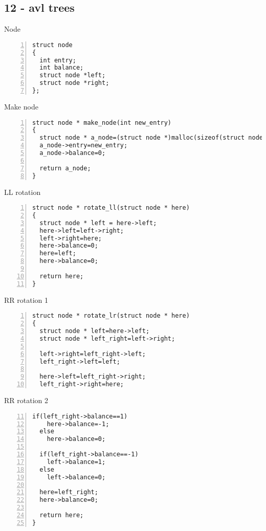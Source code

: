 \documentclass{beamer}
\begin{document}
\subsection*{12 - avl trees}
\begin{frame}[fragile]{Node}
\begin{lstlisting}[numbers=left]
struct node
{
  int entry;
  int balance;
  struct node *left;
  struct node *right;
};\end{lstlisting}
\end{frame}
\begin{frame}[fragile]{Make node}
\begin{lstlisting}[numbers=left]
struct node * make_node(int new_entry)
{
  struct node * a_node=(struct node *)malloc(sizeof(struct node));
  a_node->entry=new_entry;
  a_node->balance=0;

  return a_node;
}
\end{lstlisting}
\end{frame}
\begin{frame}[fragile]{LL rotation}
\begin{lstlisting}[numbers=left]
struct node * rotate_ll(struct node * here)
{
  struct node * left = here->left;
  here->left=left->right;
  left->right=here;
  here->balance=0;
  here=left;
  here->balance=0;

  return here;
}
\end{lstlisting}
\end{frame}
\begin{frame}[fragile]{RR rotation 1}
\begin{lstlisting}[numbers=left]
struct node * rotate_lr(struct node * here)
{
  struct node * left=here->left;
  struct node * left_right=left->right;

  left->right=left_right->left;
  left_right->left=left;

  here->left=left_right->right;
  left_right->right=here;
\end{lstlisting}
\end{frame}
\begin{frame}[fragile]{RR rotation 2}
\begin{lstlisting}[numbers=left, firstnumber=11]
  if(left_right->balance==1)
    here->balance=-1;
  else
    here->balance=0;
  
  if(left_right->balance==-1)
    left->balance=1;
  else
    left->balance=0;
		  
  here=left_right;
  here->balance=0;
  
  return here;
}
\end{lstlisting}
\end{frame}
\end{document}
